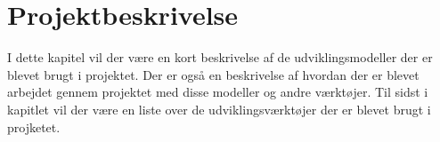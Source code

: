 \chapter{Projektbeskrivelse}
I dette kapitel vil der være en kort beskrivelse af de udviklingsmodeller der er blevet brugt i projektet. Der er også en beskrivelse af hvordan der er blevet arbejdet gennem projektet med disse modeller og andre værktøjer. Til sidst i kapitlet vil der være en liste over de udviklingsværktøjer der er blevet brugt i projketet.\\



